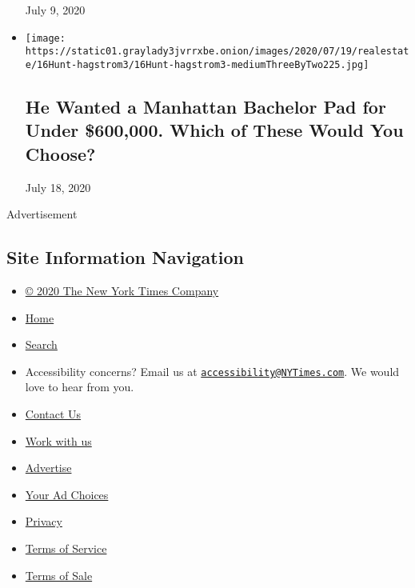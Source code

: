 \begin{itemize}
  July 9, 2020
\item
  \href{https://www.nytimes3xbfgragh.onion/interactive/2020/07/16/realestate/16hunt-hagstrom.html}{}

  \texttt{[image: https://static01.graylady3jvrrxbe.onion/images/2020/07/19/realestate/16Hunt-hagstrom3/16Hunt-hagstrom3-mediumThreeByTwo225.jpg]}

  \hypertarget{he-wanted-a-manhattan-bachelor-pad-for-under-600000-which-of-these-would-you-choose}{%
  \subsection{He Wanted a Manhattan Bachelor Pad for Under \$600,000.
  Which of These Would You
  Choose?}\label{he-wanted-a-manhattan-bachelor-pad-for-under-600000-which-of-these-would-you-choose}}

  July 18, 2020
\end{itemize}

Advertisement

\hypertarget{site-information-navigation}{%
\subsection{Site Information
Navigation}\label{site-information-navigation}}

\begin{itemize}
\tightlist
\item
  \href{https://help.nytimes3xbfgragh.onion/hc/en-us/articles/115014792127-Copyright-notice}{©
  2020 The New York Times Company}
\item
  \href{https://www.nytimes3xbfgragh.onion}{Home}
\item
  \href{https://www.nytimes3xbfgragh.onion/search/}{Search}
\item
  Accessibility concerns? Email us at
  \href{mailto:accessibility@NYTimes.com}{\nolinkurl{accessibility@NYTimes.com}}.
  We would love to hear from you.
\item
  \href{https://help.nytimes3xbfgragh.onion/hc/en-us/articles/115015385887-Contact-Us}{Contact
  Us}
\item
  \href{https://www.nytco.com/careers/}{Work with us}
\item
  \href{https://nytmediakit.com/}{Advertise}
\item
  \href{https://help.nytimes3xbfgragh.onion/hc/en-us/articles/115014892108-Privacy-policy\#pp}{Your
  Ad Choices}
\item
  \href{https://help.nytimes3xbfgragh.onion/hc/en-us/articles/115014892108-Privacy-policy}{Privacy}
\item
  \href{https://help.nytimes3xbfgragh.onion/hc/en-us/articles/115014893428-Terms-of-service}{Terms
  of Service}
\item
  \href{https://help.nytimes3xbfgragh.onion/hc/en-us/articles/115014893968-Terms-of-sale}{Terms
  of Sale}
\end{itemize}

